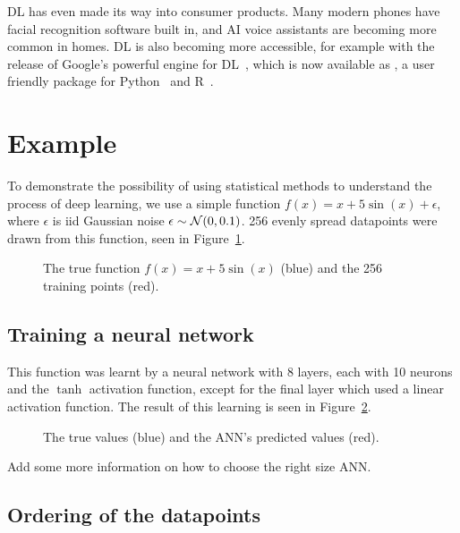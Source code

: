 \ac{DL} has even made its way into consumer products.
Many modern phones have facial recognition software built in, and \ac{AI} voice assistants are becoming more common in homes.
\ac{DL} is also becoming more accessible, for example with the release of Google's powerful  engine for \ac{DL}~\autocite{abadi2016}, which is now available as , a user friendly package for Python~\autocite{chollet2015} and R~\autocite{allaire2018}.

\section{Example}

To demonstrate the possibility of using statistical methods to understand the process of deep learning, we use a simple function \(f(x) = x + 5 \sin(x) + \epsilon\), where \(\epsilon\) is iid Gaussian noise \(\epsilon \sim \mathcal{N}(0, 0.1)\).
256 evenly spread datapoints were drawn from this function, seen in Figure~\ref{fig:sin-x-dataset}.

\begin{figure}[htbp]
	\centering
	
	\caption{The true function \(f(x) = x + 5 \sin(x)\) (blue) and the 256 training points (red).}
	\label{fig:sin-x-dataset}
\end{figure}

\subsection{Training a neural network}

This function was learnt by a neural network with 8 layers, each with 10 neurons and the \(\tanh\) activation function, except for the final layer which used a linear activation function.
The result of this learning is seen in Figure~\ref{fig:ann-preds}.

\begin{figure}[htbp]
	\centering
	
	\caption{The true values (blue) and the ANN's predicted values (red).}
	\label{fig:ann-preds}
\end{figure}

\begin{todo}
	Add some more information on how to choose the right size ANN.
\end{todo}

\subsection{Ordering of the datapoints}

